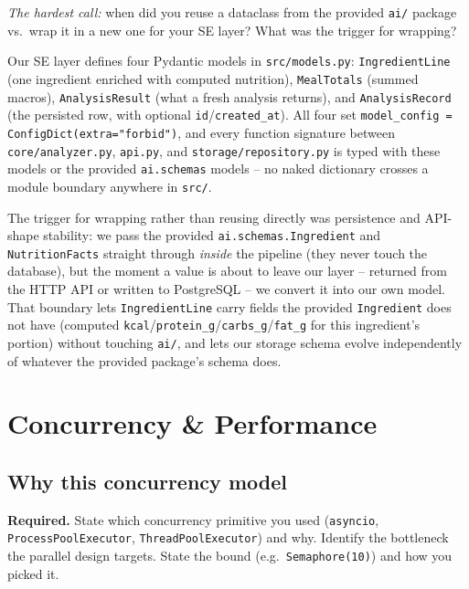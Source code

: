 \documentclass[11pt,a4paper]{article}
\newenvironment{deliverbox}{\begin{deliverboxshown}}{\end{deliverboxshown}}
\newenvironment{probebox}{\begin{probeboxshown}}{\end{probeboxshown}}
\newenvironment{deliverbox}{\setbox0\vbox\bgroup}{\egroup\ignorespacesafterend}
\newenvironment{probebox}{\setbox0\vbox\bgroup}{\egroup\ignorespacesafterend}
\begin{document}
\begin{probebox}
\textit{The hardest call:} when did you reuse a dataclass from the provided \texttt{ai/} package vs.\ wrap it in a new one for your SE layer? What was the trigger for wrapping?
\end{probebox}

\par\noindent
Our SE layer defines four Pydantic models in \texttt{src/models.py}:
\texttt{IngredientLine} (one ingredient enriched with computed nutrition),
\texttt{MealTotals} (summed macros), \texttt{AnalysisResult} (what a fresh
analysis returns), and \texttt{AnalysisRecord} (the persisted row, with
optional \texttt{id}/\texttt{created\_at}). All four set
\texttt{model\_config = ConfigDict(extra="forbid")}, and every function
signature between \texttt{core/analyzer.py}, \texttt{api.py}, and
\texttt{storage/repository.py} is typed with these models or the provided
\texttt{ai.schemas} models -- no naked dictionary crosses a module boundary
anywhere in \texttt{src/}.

\par\noindent
The trigger for wrapping rather than reusing directly was persistence and
API-shape stability: we pass the provided \texttt{ai.schemas.Ingredient} and
\texttt{NutritionFacts} straight through \emph{inside} the pipeline (they
never touch the database), but the moment a value is about to leave our
layer -- returned from the HTTP API or written to PostgreSQL -- we convert
it into our own model. That boundary lets \texttt{IngredientLine} carry
fields the provided \texttt{Ingredient} does not have (computed
\texttt{kcal}/\texttt{protein\_g}/\texttt{carbs\_g}/\texttt{fat\_g} for this
ingredient's portion) without touching \texttt{ai/}, and lets our storage
schema evolve independently of whatever the provided package's schema does.

\section{Concurrency \& Performance}\label{sec:concurrency}

\subsection{Why this concurrency model}

\begin{deliverbox}
\textbf{Required.} State which concurrency primitive you used (\texttt{asyncio}, \texttt{ProcessPoolExecutor}, \texttt{ThreadPoolExecutor}) and why. Identify the bottleneck the parallel design targets. State the bound (e.g.\ \texttt{Semaphore(10)}) and how you picked it.
\end{deliverbox}
\end{document}
